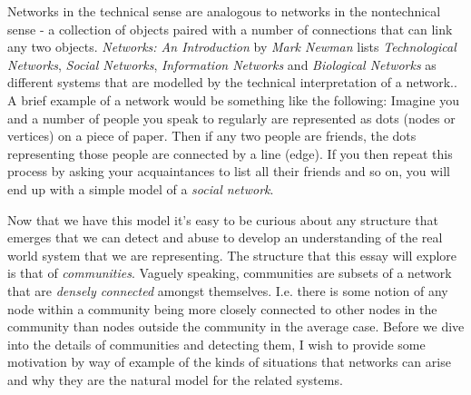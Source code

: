 Networks in the technical sense are analogous to networks in the nontechnical sense - a collection of objects paired with a number of connections that can link any two objects. \emph{Networks: An Introduction} by \emph{Mark Newman} lists \emph{Technological Networks}, \emph{Social Networks}, \emph{Information Networks} and \emph{Biological Networks} as different systems that are modelled by the technical interpretation of a network.\cite[Contents]{newman10}. A brief example of a network would be something like the following: Imagine you and a number of people you speak to regularly are represented as dots (nodes or vertices) on a piece of paper. Then if any two people are friends, the dots representing those people are connected by a line (edge). If you then repeat this process by asking your acquaintances to list all their friends and so on, you will end up with a simple model of a \emph{social network}.

Now that we have this model it's easy to be curious about any structure that emerges that we can detect and abuse to develop an understanding of the real world system that we are representing. The structure that this essay will explore is that of \emph{communities}. Vaguely speaking, communities are subsets of a network that are \emph{densely connected} amongst themselves. I.e. there is some notion of any node within a community being more closely connected to other nodes in the community than nodes outside the community in the average case. Before we dive into the details of communities and detecting them, I wish to provide some motivation by way of example of the kinds of situations that networks can arise and why they are the natural model for the related systems.

